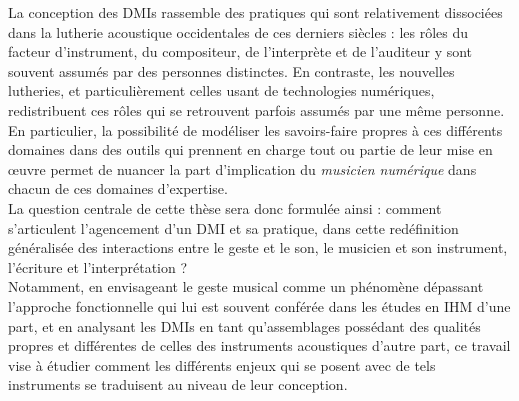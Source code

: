 \noindent La conception des \glspl{DMI} rassemble des pratiques qui sont relativement dissociées dans la lutherie acoustique occidentales de ces derniers siècles : les rôles du facteur d'instrument, du compositeur, de l'interprète et de l'auditeur y sont souvent assumés par des personnes distinctes. En contraste, les nouvelles lutheries, et particulièrement celles usant de technologies numériques, redistribuent 
ces rôles qui se retrouvent parfois assumés par une même personne. En particulier, la possibilité de modéliser les savoirs-faire propres à ces différents domaines dans des outils qui prennent en charge tout ou partie de leur mise en œuvre permet de nuancer la part d'implication du \textit{musicien numérique} dans chacun de ces domaines d'expertise.\\
\indent La question centrale de cette thèse sera donc formulée ainsi : comment s'articulent l'agencement d'un \gls{DMI} et sa pratique, dans cette redéfinition généralisée des interactions entre le geste et le son, le musicien et son instrument, l'écriture et l'interprétation ?\\
\indent Notamment, en envisageant le geste musical comme un phénomène dépassant l'approche fonctionnelle qui lui est souvent conférée dans les études en \gls{IHM} d'une part, et en analysant les \glspl{DMI} en tant qu'assemblages possédant des qualités propres et différentes de celles des instruments acoustiques d'autre part, ce travail vise à étudier comment les différents enjeux qui se posent avec de tels instruments se traduisent au niveau de leur conception.

